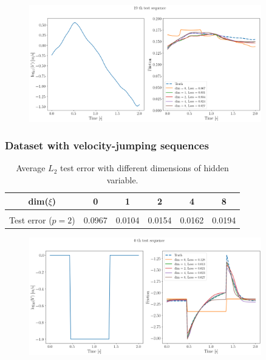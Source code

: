 \begin{figure}[H]
    \centering
    \includegraphics[width=0.9\textwidth]{images/dtTSqBurigede2.png}
    \label{fig:dtTSqBurigede2}
\end{figure}
\subsubsection{Dataset with velocity-jumping sequences}
\begin{table}[H]
    \centering
    \begin{tabular}{c|ccccc}
        \hline
        dim($\xi$) & 0 & 1 & 2 & 4 & 8\\
        \hline \\[-1em]
        Test error ($p=2$) & 0.0967  & 0.0104 & 0.0154 & 0.0162 & 0.0194\\
        \hline
    \end{tabular}
    \caption{Average $L_2$ test error with different dimensions of hidden variable.}
    \label{tab:resDtTSqJump}
\end{table}
\begin{figure}[H]
    \centering
    \includegraphics[width=0.9\textwidth]{images/dtTSqJump1.png}
    \label{fig:dtTSqJump1}
\end{figure}

